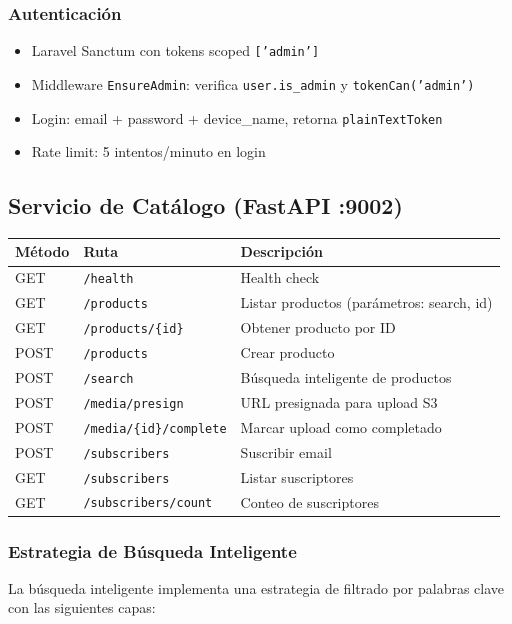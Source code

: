 \documentclass[11pt,a4paper]{article}
\begin{document}
\subsubsection{Autenticación}
\begin{itemize}
    \item Laravel Sanctum con tokens scoped \texttt{['admin']}
    \item Middleware \texttt{EnsureAdmin}: verifica \texttt{user.is\_admin} y \texttt{tokenCan('admin')}
    \item Login: email + password + device\_name, retorna \texttt{plainTextToken}
    \item Rate limit: 5 intentos/minuto en login
\end{itemize}

\subsection{Servicio de Catálogo (FastAPI :9002)}

\begin{tabularx}{\textwidth}{|l|X|l|}
\hline
\textbf{Método} & \textbf{Ruta} & \textbf{Descripción} \\
\hline
GET & \texttt{/health} & Health check \\
GET & \texttt{/products} & Listar productos (parámetros: search, id) \\
GET & \texttt{/products/\{id\}} & Obtener producto por ID \\
POST & \texttt{/products} & Crear producto \\
POST & \texttt{/search} & Búsqueda inteligente de productos \\
POST & \texttt{/media/presign} & URL presignada para upload S3 \\
POST & \texttt{/media/\{id\}/complete} & Marcar upload como completado \\
POST & \texttt{/subscribers} & Suscribir email \\
GET & \texttt{/subscribers} & Listar suscriptores \\
GET & \texttt{/subscribers/count} & Conteo de suscriptores \\
\hline
\end{tabularx}

\subsubsection{Estrategia de Búsqueda Inteligente}
La búsqueda inteligente implementa una estrategia de filtrado por palabras clave con las siguientes capas:
\end{document}
